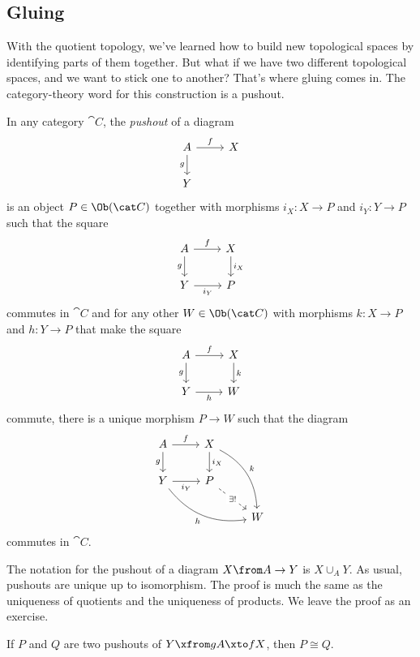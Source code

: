 \documentclass[noname]{notes}
\begin{document}
\subsection{Gluing} 

With the quotient topology, we've learned how to build new topological spaces by identifying parts of them together. But what if we have two different topological spaces, and we want to stick one to another? That's where gluing comes in. The category-theory word for this construction is a pushout. 

\begin{definition}
	In any category $\cat C$, the \emph{pushout} of a diagram 
	\[
		\begin{tikzcd}
			A \ar[r, "f"] \ar[d, "g"'] & X\\
			Y
		\end{tikzcd}
	\]
	is an object $P \in \Ob(\cat C)$ together with morphisms $i_X \colon X \to P$ and $i_Y \colon Y \to P$ such that the square 
	\[
		\begin{tikzcd}
			A \ar[r, "f"] \ar[d, "g"'] & X \ar[d, "i_X"] \\
			Y \ar[r, "i_Y"'] & P
		\end{tikzcd}	
	\]
	commutes in $\cat C$ and for any other $W \in \Ob(\cat C)$ with morphisms $k \colon X \to P$ and $h \colon Y \to P$ that make the square 
	\[
		\begin{tikzcd}
			A \ar[r, "f"] \ar[d, "g"'] & X \ar[d, "k"] \\
			Y \ar[r, "h"'] & W
		\end{tikzcd}	
	\]
	commute, there is a unique morphism $P \to W$ such that the diagram 
	\[
		\begin{tikzcd}
			A \ar[r, "f"] \ar[d, "g"'] & X \ar[d, "i_X"] \ar[ddr, "k", bend left=30]\\
			Y \ar[r, "i_Y"']\ar[drr, "h"', bend right=30] & P \ar[dr, dashed, "\exists !" description] \\
			& & W
		\end{tikzcd}	
	\]
	commutes in $\cat C$.
\end{definition}	

The notation for the pushout of a diagram $X \from A \to Y$ is $X \cup_A Y$. As usual, pushouts are unique up to isomorphism. The proof is much the same as the uniqueness of quotients and the uniqueness of products. We leave the proof as an exercise. 

\begin{proposition}
	If $P$ and $Q$ are two pushouts of $Y \xfrom g A \xto f X$, then $P \cong Q$. 
\end{proposition}
\end{document}
